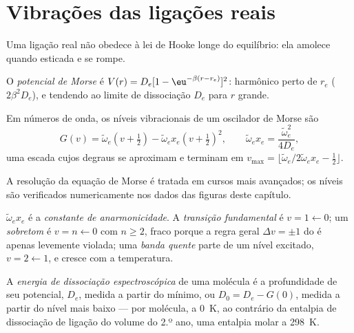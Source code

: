 \section{Vibrações das ligações reais}\label{sec:b3:rovibrational-spectroscopy:real-bonds}

Uma ligação real não obedece à lei de Hooke longe do equilíbrio: ela amolece
quando esticada e se rompe.

\begin{definition}\label{def:b3:rovibrational-spectroscopy:morse}
O \emph{potencial de Morse} é $V(r) = D_e[1 -
\eu^{-\beta(r - r_e)}]^2$: harmônico perto de $r_e$ ( $2\beta^2D_e$), e
tendendo ao limite de dissociação $D_e$ para $r$ grande.
\end{definition}

\begin{proposition}\label{prop:b3:rovibrational-spectroscopy:morse-levels}
Em números de onda, os níveis vibracionais de um oscilador de Morse são
\[
G(v) = \tilde\omega_e(v + \tfrac12) - \tilde\omega_ex_e(v + \tfrac12)^2, \qquad
\tilde\omega_ex_e = \frac{\tilde\omega_e^2}{4D_e},
\]
uma escada cujos degraus se aproximam e terminam em $v_{\max} = \lfloor\tilde\omega_e/
2\tilde\omega_ex_e - \frac12\rfloor$.
\end{proposition}
\admitted

A resolução da equação de Morse é tratada em cursos mais avançados; os
níveis são verificados numericamente nos dados das figuras deste capítulo.

\begin{definition}\label{def:b3:rovibrational-spectroscopy:anharmonic}
$\tilde\omega_ex_e$ é a \emph{constante de anarmonicidade}.
A \emph{transição fundamental}
é $v = 1 \leftarrow 0$; um \emph{sobretom} é $v = n \leftarrow 0$
com $n \ge 2$, fraco porque a regra geral $\Delta v = \pm1$ do  é apenas levemente violada; uma \emph{banda quente} parte
de um nível excitado, $v = 2 \leftarrow 1$, e cresce com a temperatura.
\end{definition}

\begin{definition}\label{def:b3:rovibrational-spectroscopy:dissociation}
A \emph{energia de dissociação espectroscópica}
de uma molécula é a profundidade de seu potencial, $D_e$, medida a partir do
mínimo, ou $D_0 = D_e - G(0)$, medida a partir do nível mais baixo --- por
molécula, a \qty{0}{K}, ao contrário da entalpia de dissociação de ligação do volume do
2.º ano, uma entalpia molar a \qty{298}{K}.
\end{definition}


